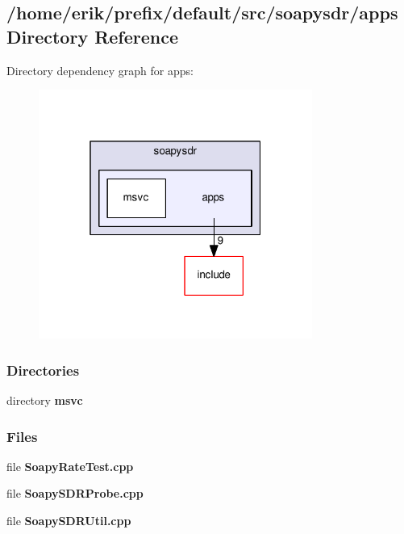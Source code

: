 \subsection{/home/erik/prefix/default/src/soapysdr/apps Directory Reference}
\label{dir_545d7b388f4e4bc195de5f05b10d2d3d}
Directory dependency graph for apps\+:
\nopagebreak
\begin{figure}[H]
\begin{center}
\leavevmode
\includegraphics[width=254pt]{dir_545d7b388f4e4bc195de5f05b10d2d3d_dep}
\end{center}
\end{figure}
\subsubsection*{Directories}
\begin{DoxyCompactItemize}
\item 
directory {\bf msvc}
\end{DoxyCompactItemize}
\subsubsection*{Files}
\begin{DoxyCompactItemize}
\item 
file {\bf Soapy\+Rate\+Test.\+cpp}
\item 
file {\bf Soapy\+S\+D\+R\+Probe.\+cpp}
\item 
file {\bf Soapy\+S\+D\+R\+Util.\+cpp}
\end{DoxyCompactItemize}
